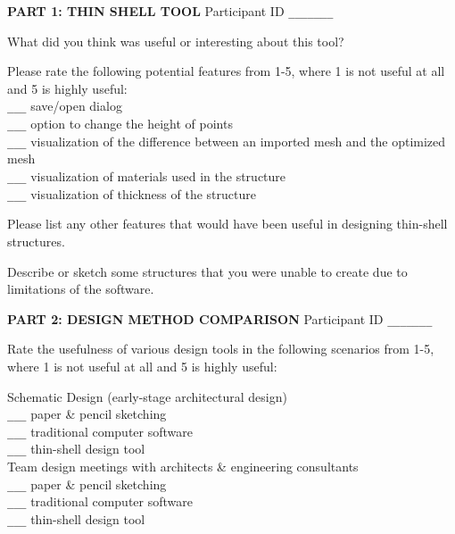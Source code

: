 \documentclass[12pt]{article}
\begin{document}
{\bf PART 1: THIN SHELL TOOL} 
\hfill Participant ID \verb+_______+
\vspace{0.3in}

What did you think was useful or interesting about this tool?
\vspace{1.3in}

Please rate the following potential features from 1-5, where 1 is not useful at all and 5 is highly useful: \\

\verb+___+ save/open dialog\\
\verb+___+ option to change the height of points\\
\verb+___+ visualization of the difference between an imported mesh and the optimized mesh\\
\verb+___+ visualization of materials used in the structure\\
\verb+___+ visualization of thickness of the structure


\vspace{0.3in}

Please list any other features that would have been useful in designing thin-shell structures.
\vspace{1.5in}




Describe or sketch some structures that you were unable to create due to limitations of the software.
\vspace{1in}



\newpage
{\bf PART 2: DESIGN METHOD COMPARISON} 
\hfill Participant ID \verb+_______+
\vspace{0.3in}

Rate the usefulness of various design tools in the following scenarios from 1-5,
where 1 is not useful at all and 5 is highly useful:


\vspace{0.15in}


Schematic Design (early-stage architectural design)\\
\verb+___+ paper \& pencil sketching \\
\verb+___+ traditional computer software \\
\verb+___+ thin-shell design tool \\

Team design meetings with architects \& engineering consultants\\
\verb+___+ paper \& pencil sketching \\
\verb+___+ traditional computer software \\
\verb+___+ thin-shell design tool \\
\end{document}
